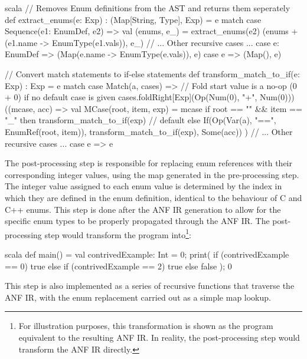 \begin{code}{scala}
    // Removes Enum definitions from the AST and returns them seperately
    def extract_enums(e: Exp) : (Map[String, Type], Exp) = e match {
        case Sequence(e1: EnumDef, e2) =>
            val (enums, e_) = extract_enums(e2)
            (enums + (e1.name -> EnumType(e1.vals)), e_)
        // ... Other recursive cases ...
        case e: EnumDef => (Map(e.name -> EnumType(e.vals)), e)
        case e => (Map(), e)
    }

    // Convert match statements to if-else statements
    def transform_match_to_if(e: Exp) : Exp = e match {
        case Match(a, cases) =>
            // Fold start value is a no-op (0 + 0) if no default case is given
            cases.foldRight[Exp](Op(Num(0), "+", Num(0)))((mcase, acc) => {
                val MCase(root, item, exp) = mcase
                if root == "" && item == "_" then
                    transform_match_to_if(exp)    // default
                else
                    If(Op(Var(a), "==", EnumRef(root, item)), transform_match_to_if(exp), Some(acc))
            })
        // ... Other recursive cases ...
        case e => e
    }
\end{code}

The post-processing step is responsible for replacing enum references with their corresponding
integer values, using the map generated in the pre-processing step. The integer value assigned to
each enum value is determined by the index in which they are defined in the enum definition,
identical to the behaviour of C and C++ enums. This step is done after the ANF IR generation to
allow for the specific enum types to be properly propagated through the ANF IR\@. The post-processing
step would transform the program into\footnote{For illustration purposes, this transformation is
    shown as the program equivalent to the resulting ANF IR\@. In reality, the post-processing step would
    transform the ANF IR directly.}:

\begin{code}{scala}
    def main() = {
        val contrivedExample: Int = 0;
        print(
            if (contrivedExample == 0) {
                true
            } else if (contrivedExample == 2) {
                true
            } else {
                false
            }
        );
        0
    }
\end{code}

This step is also implemented as a series of recursive functions that traverse the ANF IR, with the
enum replacement carried out as a simple map lookup.

